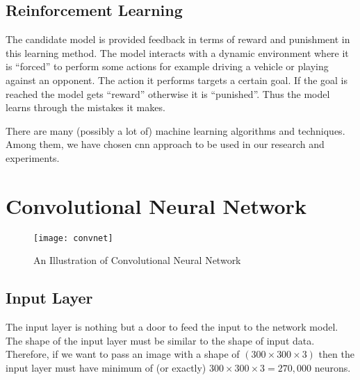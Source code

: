         \subsection{Reinforcement Learning}
            The candidate model is provided feedback in terms of reward and punishment in this learning method\cite{sutton2018reinforcement}. The model interacts with a dynamic environment where it is ``forced'' to perform some actions for example driving a vehicle or playing against an opponent\cite{sutton2018reinforcement}. The action it performs targets a certain goal. If the goal is reached the model gets ``reward'' otherwise it is ``punished''. Thus the model learns through the mistakes it makes.
            
            \vspace{5mm}
            There are many (possibly a lot of) machine learning algorithms and techniques. Among them, we have chosen \acrfull{cnn} approach\cite{liang2015recurrent} to be used in our research and experiments.            
        
    \section{Convolutional Neural Network}
        
        \begin{figure}[h]
            \centering
            \texttt{[image: convnet]}
            \caption{An Illustration of Convolutional Neural Network}
            \label{fig:convnet}
        \end{figure}   
    
        \subsection{Input Layer}
            The input layer is nothing but a door to feed the input to the network model. The shape of the input layer must be similar to the shape of input data\cite{liang2015recurrent}. Therefore, if we want to pass an image with a shape of $(300\times 300\times 3)$ then the input layer must have minimum of (or exactly) $300\times 300\times 3 = 270,000$ neurons.
        
